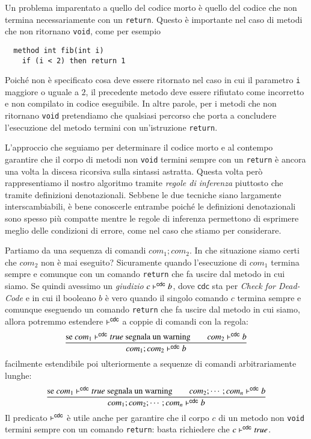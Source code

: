 Un problema imparentato a quello del codice morto \`e quello del
codice che non termina necessariamente con un \texttt{return}. Questo
\`e importante nel caso di metodi che non ritornano \texttt{void}, come
per esempio
%
\begin{verbatim}
  method int fib(int i)
    if (i < 2) then return 1 
\end{verbatim}
%
Poich\'e non \`e specificato cosa deve essere ritornato nel caso in cui
il parametro \texttt{i} \e maggiore o uguale a $2$, il precedente metodo
deve essere rifiutato come incorretto e non compilato in codice eseguibile.
In altre parole, per i metodi che non ritornano \texttt{void} pretendiamo
che qualsiasi percorso che porta a concludere l'esecuzione del metodo
termini con un'istruzione \texttt{return}.

L'approccio che seguiamo per determinare il codice morto e al contempo
garantire che il corpo di metodi non \texttt{void} termini sempre con
un \texttt{return} \`e ancora una
volta la discesa ricorsiva sulla sintassi astratta. Questa volta per\`o
rappresentiamo il nostro algoritmo tramite \emph{regole di inferenza}
piuttosto che tramite definizioni denotazionali. Sebbene le due tecniche siano
largamente interscambiabili, \`e bene conoscerle entrambe poich\'e
le definizioni denotazionali sono spesso pi\`u compatte mentre le regole
di inferenza permettono di esprimere meglio delle condizioni di errore,
come nel caso che stiamo per considerare.

Partiamo da una sequenza di comandi $\mathit{com}_1;\mathit{com}_2$.
In che situazione siamo certi che $\mathit{com}_2$ non \`e mai eseguito?
Sicuramente quando l'esecuzione di $\mathit{com}_1$ termina sempre e
comunque con un comando \texttt{return} che fa uscire dal metodo
in cui siamo. Se quindi avessimo un
\emph{giudizio} $c\vdash^{\mathsf{cdc}} b$, dove $\mathsf{cdc}$ sta per
\emph{Check for Dead-Code} e in cui il booleano $b$ \`e vero quando il singolo
comando $c$ termina sempre e comunque eseguendo un comando \texttt{return} che
fa uscire dal metodo in cui siamo,
allora potremmo estendere $\vdash^{\mathsf{cdc}}$ a coppie di comandi con la regola:
%
\[
  \frac{\text{se }\mathit{com}_1\vdash^{\mathsf{cdc}}\mathit{true}\text{ segnala un warning}
    \qquad\mathit{com}_2\vdash^{\mathsf{cdc}} b}{\mathit{com}_1;\mathit{com}_2\vdash^{\mathsf{cdc}} b}
\]
%
facilmente estendibile poi ulteriormente
a sequenze di comandi arbitrariamente lunghe:
%
\begin{equation}\label{eq:cdc_sequence}
  \frac{\text{se }\mathit{com}_1\vdash^{\mathsf{cdc}}\mathit{true}\text{ segnala un warning}
    \qquad\mathit{com}_2;\cdots;\mathit{com}_n\vdash^{\mathsf{cdc}} b}
    {\mathit{com}_1;\mathit{com}_2;\cdots;\mathit{com}_n\vdash^{\mathsf{cdc}} b}
\end{equation}
%
Il predicato $\vdash^{\mathsf{cdc}}$ \`e utile anche per garantire che il corpo
$c$ di un metodo non \texttt{void} termini sempre con un comando
\texttt{return}: basta richiedere che $c\vdash^{\mathsf{cdc}}\mathit{true}$.

